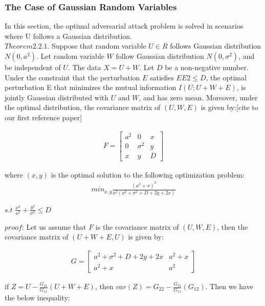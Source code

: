 \documentclass[paper=a4, fontsize=11pt]{scrartcl}
\numberwithin{equation}{section}		%
\numberwithin{figure}{section}			%
\numberwithin{table}{section}				%
\begin{document}
\subsubsection{The Case of Gaussian Random Variables}
In this section, the optimal adversarial attack problem is solved in scenarios where U follows a Gaussian distribution.
\\

$Theorem 2.2.1$. Suppose that random variable $U \in R$ follows Gaussian distribution $N(0, a^2)$. Let random
variable $W$ follow Gaussian distribution $N(0, \sigma^2
)$, and be independent of $U$. The data $X = U + W$. Let $D$
be a non-negative number. Under the constraint that the perturbation $E$ satisfies $E{E2} \leq D$, the optimal
perturbation E that minimizes the mutual information $I(U; U+W+E)$, is jointly Gaussian distributed with
$U$ and $W$, and has zero mean. Moreover, under the optimal distribution, the covariance matrix of $(U, W, E)$
is given by:[cite to our first reference paper]

\begin{align}
    F = 
    \begin{bmatrix}
    a^2 & 0 & x\\
    0 & \sigma^2 & y\\
    x & y & D
    \end{bmatrix}
\end{align}

where $(x, y)$ is the optimal solution to the following optimization problem:
\begin{align}
  min_{x, y} \frac{(a^2+x)^2}{a^2(a^2+\sigma^2+D+2y+2x)}    \end{align}

\begin{center}
  $s.t$ \quad $\frac{x^2}{a^2} + \frac{y^2}{\sigma^2} \leq D$  
\end{center}
$proof$: Let us assume that $F$ is the covariance matrix of $(U, W, E)$, then the covariance
matrix of $(U + W + E, U)$ is given by:

\begin{align}
    G = 
    \begin{bmatrix}
    a^2+\sigma^2+D+2y+2x  & a^2+x\\
    a^2+x & a^2
    \end{bmatrix}
\end{align}

if $Z = U -\frac{G_{21}}{G_{11}}(U+W+E)$, then $var(Z) = G_{22} - \frac{G_{21}}{G_{11}} (G_{12})$. Then we have the below inequality:
\end{document}

